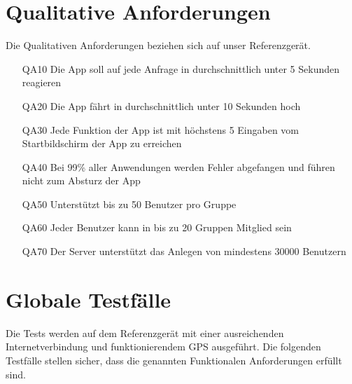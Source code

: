 \documentclass{scrartcl}
\begin{document}
	
	\section{Qualitative Anforderungen}
	Die Qualitativen Anforderungen beziehen sich auf unser Referenzgerät.
	\begin{itemize}
		\item[QA10] Die App soll auf jede Anfrage in durchschnittlich unter 5 Sekunden reagieren
		\item[QA20] Die App fährt in durchschnittlich unter 10 Sekunden hoch
		\item[QA30] Jede Funktion der App ist mit höchstens 5 Eingaben vom Startbildschirm der App zu erreichen
		\item[QA40] Bei 99\% aller Anwendungen werden Fehler abgefangen und führen nicht zum Absturz der App
		\item[QA50] Unterstützt bis zu 50 Benutzer pro Gruppe
		\item[QA60] Jeder Benutzer kann in bis zu 20 Gruppen \gls{Mitglied} sein
		\item[QA70] Der Server unterstützt das Anlegen von mindestens 30000 Benutzern
	\end{itemize}
	
	\newpage
	
	
	\section{Globale Testfälle}
Die Tests werden auf dem Referenzgerät mit einer ausreichenden Internetverbindung und funktionierendem GPS ausgeführt. \newline
	Die folgenden Testfälle stellen sicher, dass die genannten Funktionalen Anforderungen erfüllt sind.
	
\end{document}
